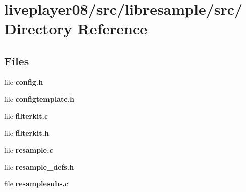 \section{liveplayer08/src/libresample/src/ Directory Reference}
\label{dir_30a43578707650dece8436ac3455580f}
\subsection*{Files}
\begin{CompactItemize}
\item 
file {\bf config.h}
\item 
file {\bf configtemplate.h}
\item 
file {\bf filterkit.c}
\item 
file {\bf filterkit.h}
\item 
file {\bf resample.c}
\item 
file {\bf resample\_\-defs.h}
\item 
file {\bf resamplesubs.c}
\end{CompactItemize}
